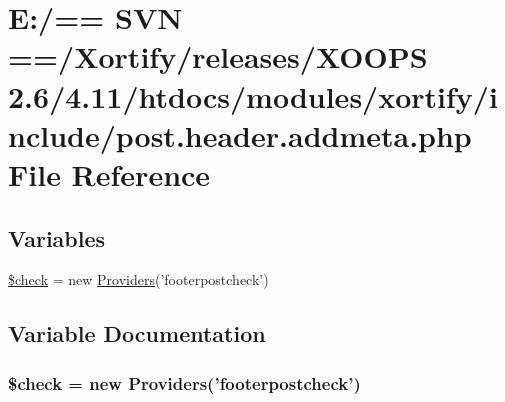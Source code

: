 \hypertarget{post_8header_8addmeta_8php}{\section{E\-:/== S\-V\-N ==/\-Xortify/releases/\-X\-O\-O\-P\-S 2.6/4.11/htdocs/modules/xortify/include/post.header.\-addmeta.\-php File Reference}
\label{post_8header_8addmeta_8php}
}
\subsection*{Variables}
\begin{DoxyCompactItemize}
\item 
\hyperlink{post_8header_8addmeta_8php_a830cf70d25fefacddcf4c6bc3fd7a0e0}{\$check} = new \hyperlink{class_providers}{Providers}('footerpostcheck')
\end{DoxyCompactItemize}


\subsection{Variable Documentation}
\hypertarget{post_8header_8addmeta_8php_a830cf70d25fefacddcf4c6bc3fd7a0e0}{
\subsubsection[{\$check}]{\setlength{\rightskip}{0pt plus 5cm}\$check = new {\bf Providers}('footerpostcheck')}}\label{post_8header_8addmeta_8php_a830cf70d25fefacddcf4c6bc3fd7a0e0}
